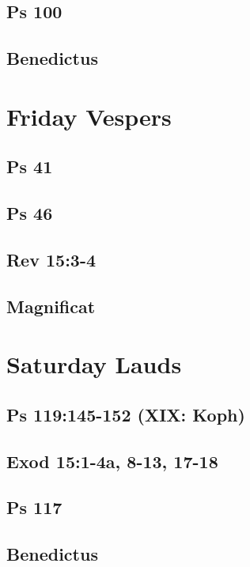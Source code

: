 \subsection{Ps 100}

\subsection{Benedictus}


\section{Friday Vespers}

\subsection{Ps 41}

\subsection{Ps 46}

\subsection{Rev 15:3-4}

\subsection{Magnificat}


\section{Saturday Lauds}

\subsection{Ps 119:145-152 (XIX: Koph)}

\subsection{Exod 15:1-4a, 8-13, 17-18}

\subsection{Ps 117}

\subsection{Benedictus}



